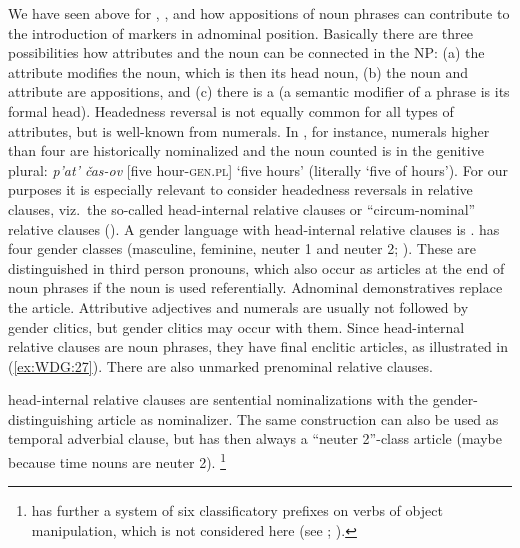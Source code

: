 \documentclass[output=collectionpaper]{langsci/langscibook}
\begin{document}
We have seen above for , , and  how appositions of noun phrases can contribute to the introduction of markers in adnominal position. Basically there are three possibilities how attributes and the noun can be connected in the NP: (a) the attribute modifies the noun, which is then its head noun, (b) the noun and attribute are appositions, and (c) there is a  (a semantic modifier of a phrase is its formal head). Headedness reversal is not equally common for all types of attributes, but is well-known from numerals. In , for instance, numerals higher than four are historically nominalized and the noun counted is in the genitive plural: \textit{p'at' čas-ov} [five hour-\textsc{gen.pl}] `five hours' (literally `five of hours'). For our purposes it is especially relevant to consider headedness reversals in relative clauses, viz.\ the so-called head-internal relative clauses or ``circum-nominal'' relative clauses (\citealt[109--121]{Lehmann1984}). A gender language with head-internal relative clauses is .  has four gender classes (masculine, feminine, neuter 1 and neuter 2; ). These are distinguished in third person pronouns, which also occur as articles at the end of noun phrases if the noun is used referentially. Adnominal demonstratives replace the article. Attributive adjectives and numerals are usually not followed by gender clitics, but gender clitics may occur with them. Since head-internal relative clauses are noun phrases, they have final enclitic articles, as illustrated in (\ref{ex:WDG:27}). There are also unmarked prenominal relative clauses.

%

 head-internal relative clauses are sentential nominalizations with the gender-distinguishing article as nominalizer. The same construction can also be used as temporal adverbial clause, but has then always a ``neuter 2''-class article (maybe because time nouns are neuter 2).%
\footnote{%
 has further a system of six classificatory prefixes on verbs of object manipulation, which is not considered here (see \citealt[459]{Fedden2010}; \citealt[185]{Fedden2011}).
} %
\end{document}
